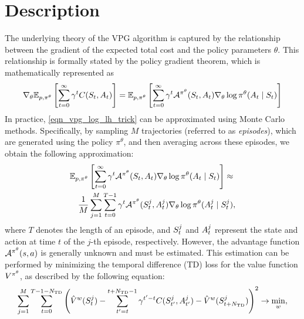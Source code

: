 \documentclass[12pt,twoside]{../../mitthesis}
\begin{document}
\section*{Description}
The underlying theory of the VPG algorithm is captured by the relationship between the gradient of the expected total cost and the policy parameters $\theta$. 
This relationship is formally stated by the policy gradient theorem, which is mathematically represented as
\begin{equation}
    \label{eqn_vpg_log_lh_trick}
    \nabla_{\theta} \E[\transit, \policy^{\theta}]{\sum_{t = 0}^{\infty} \gamma ^ t \Cost(\State_{t}, \Action_{t})} =  \E[\transit, \policy^{\theta}]{ \sum_{t = 0}^{\infty}\gamma^t\Advan^{\policy^{\theta}} (\State_t, \Action_t)\nabla_{\theta} \log \policy^{\theta}(\Action_t \mid \State_t)}
\end{equation}
In practice, \eqref{eqn_vpg_log_lh_trick} can be approximated using Monte Carlo methods. Specifically, by sampling $M$ trajectories (referred to as \textit{episodes}), which are generated using the policy $\pi^{\theta}$, and then averaging across these episodes, we obtain the following approximation:
\begin{equation}
    \label{eqn_vpg_objective_est0}
    \begin{aligned}
&\E[\transit, \policy^{\theta}]{ \sum_{t = 0}^{\infty}\gamma^t\Advan^{\policy^{\theta}} (\State_t, \Action_t)\nabla_{\theta} \log \policy^{\theta}(\Action_t \mid \State_t)} \approx \\ 
&\quad\frac{1}{M} \sum_{j = 1}^M \sum_{t=0}^{T-1} \gamma ^ t \Advan^{\policy^{\theta}}(\State_t^j, \Action_t^j) \nabla_{\theta} \log \policy^{\theta}(\Action_t^j \mid \State_t^j),
    \end{aligned}
\end{equation}
where $T$ denotes the length of an episode, and  $S_t^j$  and $A_t^j$ represent the state and action at time $t$ of the $j$-th episode, respectively.
However, the advantage function $\mathcal A^{\pi^{\theta}}(s, a)$ is generally unknown and must be estimated. This estimation can be performed by minimizing the temporal difference (TD) loss for the value function  $V^{\pi^{\theta}}$, as described by the following equation:
\begin{equation}
    \label{eqn_td_loss}
    \sum_{j=1}^M\sum_{t=0}^{T-1 - N_{\text{TD}}}\left(\hat\Value^w(\State_t^j) - \sum_{t'=t}^{t + N_{\text{TD}} - 1} \gamma^{t'-t}\Cost(\State_{t'}^j, \Action_{t'}^j) - \hat\Value^w(\State_{t + N_{\text{TD}}}^j)\right)^2 \ra \min_{w},
\end{equation}
\end{document}
